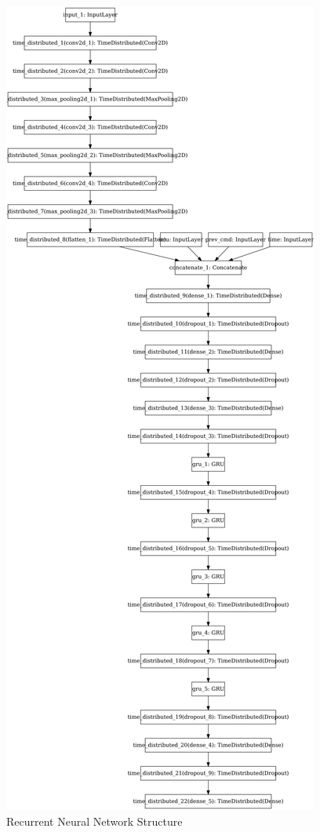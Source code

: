 \documentclass[12pt]{article}
\begin{document}
\begin{figure}
	\centering
    \includegraphics[scale=0.07]{model}
	\vspace{20pt}
	\caption[Recurrent Neural Network Structure]{Recurrent Neural Network Structure}
    \label{rnn_structure}
\end{figure}
\end{document}
